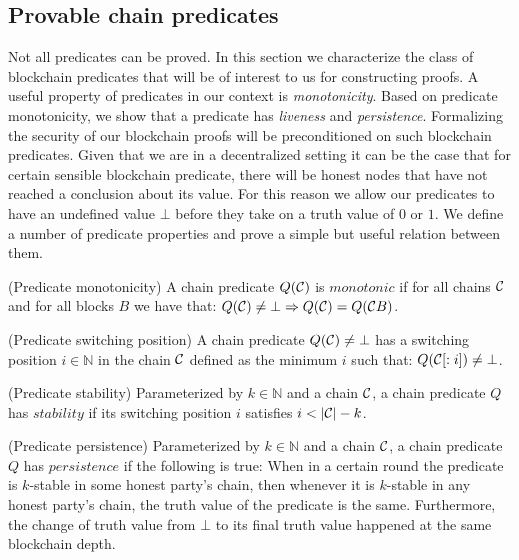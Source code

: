 \subsection{Provable chain predicates}

Not all predicates can be proved. In this section we characterize the class of
blockchain predicates that will be of interest to us for constructing proofs.
A useful property of predicates in our context is \textit{monotonicity}. Based
on predicate monotonicity, we show that a predicate has \textit{liveness} and
\textit{persistence}. Formalizing the security of our  blockchain proofs  will
be preconditioned on such blockchain predicates. Given that we are in a
decentralized setting it can be the case that for certain sensible blockchain
predicate, there will be honest nodes that have not reached a conclusion about
its value. For this reason we  allow our predicates to have an undefined value
$\bot$ before they take on a truth value of $0$ or $1$. We define a number of
predicate properties and prove a simple but useful relation between them.

\begin{definition}{(Predicate monotonicity)}
    A chain predicate $Q(\mathcal{C})$ is $\textit{monotonic}$ if for all chains
    $\mathcal{C}$ and for all blocks $B$ we have that:
    $    Q(\mathcal{C}) \neq \bot \Rightarrow Q(\mathcal{C}) = Q(\mathcal{C} B) $.

{(Predicate switching position)}
    A chain predicate $Q(\mathcal{C}) \neq \bot$ has a switching position $i \in
    \mathbb{N}$ in the chain $\mathcal{C}$ defined as the minimum $i$ such that:
 $       Q(\mathcal{C}[:i]) \neq \bot$.

 {(Predicate stability)}
    Parameterized by $k \in \mathbb{N}$ and a chain $\mathcal{C}$, a chain predicate
    $Q$ has $\textit{stability}$ if its switching position $i$ satisfies $i <
    |\mathcal{C}| - k$.

{(Predicate persistence)}
    Parameterized by $k \in \mathbb{N}$ and a chain $\mathcal{C}$, a chain predicate
    $Q$ has $\textit{persistence}$ if the following is true: When in a certain
    round the predicate is $k$-stable in some honest party's chain, then
    whenever it is $k$-stable in any honest party's chain, the truth value of
    the predicate is the same. Furthermore, the change of truth value from
    $\bot$ to its final truth value happened at the same blockchain depth.

\end{definition}

